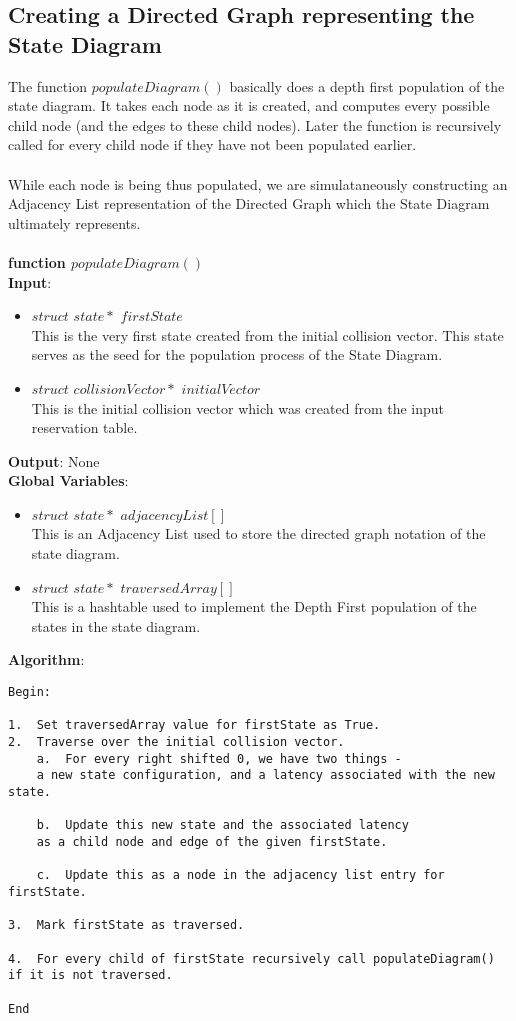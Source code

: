 \documentclass{article}
\begin{document}
\subsection{Creating a Directed Graph representing the State Diagram}
The function $populateDiagram()$ basically does a depth first population of the state diagram. It takes each node as it is created, and computes every possible child node (and the edges to these child nodes). Later the function is recursively called for every child node if they have not been populated earlier.\\ \\
While each node is being thus populated, we are simulataneously constructing an Adjacency List representation of the Directed Graph which the State Diagram ultimately represents.\\ \\
\textbf {function $populateDiagram()$}\\
\textbf {Input}: 
\begin{itemize}
    \item $struct$ $state*$ $firstState$\\ This is the very first state created from the initial collision vector. This state serves as the seed for the population process of the State Diagram.
    \item $struct$ $collisionVector*$ $initialVector$ \\ This is the initial collision vector which was created from the input reservation table.
\end{itemize}
\textbf {Output}: None\\
\textbf {Global Variables}: 
\begin{itemize}
    \item $struct$ $state*$ $adjacencyList[]$ \\This is an Adjacency List used to store the directed graph notation of the state diagram.
    \item $struct$ $state*$ $traversedArray[]$ \\This is a hashtable used to implement the Depth First population of the states in the state diagram.
\end{itemize}
\textbf{Algorithm}:
\begin{verbatim}
Begin:

1.  Set traversedArray value for firstState as True.
2.  Traverse over the initial collision vector.
    a.  For every right shifted 0, we have two things - 
    a new state configuration, and a latency associated with the new state.
    
    b.  Update this new state and the associated latency 
    as a child node and edge of the given firstState.
    
    c.  Update this as a node in the adjacency list entry for firstState.
    
3.  Mark firstState as traversed.

4.  For every child of firstState recursively call populateDiagram()
if it is not traversed.

End
\end{verbatim}
\end{document}
